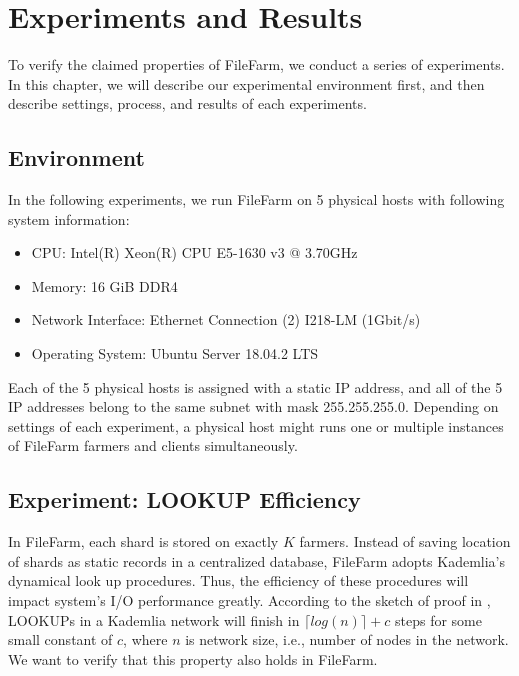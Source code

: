 \chapter{Experiments and Results}
\label{c:experiments_and_results}

To verify the claimed properties of FileFarm, we conduct a series of experiments. In this chapter, we will describe our experimental environment first, and then describe settings, process, and results of each experiments.

\section{Environment}
\label{s:expenvironment}

In the following experiments, we run FileFarm on 5 physical hosts with following system information:

\begin{itemize}
    \item CPU: Intel(R) Xeon(R) CPU E5-1630 v3 @ 3.70GHz
    \item Memory: 16 GiB DDR4
    \item Network Interface: Ethernet Connection (2) I218-LM (1Gbit/s)
    \item Operating System: Ubuntu Server 18.04.2 LTS
\end{itemize}

 \noindent Each of the 5 physical hosts is assigned with a static IP address, and all of the 5 IP addresses belong to the same subnet with mask 255.255.255.0. Depending on settings of each experiment, a physical host might runs one or multiple instances of FileFarm farmers and clients simultaneously.

\newpage

\section{Experiment: LOOKUP Efficiency}
\label{s:explookupefficiency}

In FileFarm, each shard is stored on exactly $K$ farmers. Instead of saving location of shards as static records in a centralized database, FileFarm adopts Kademlia's dynamical look up procedures. Thus, the efficiency of these procedures will impact system's I/O performance greatly. According to the sketch of proof in \cite{maymounkov2002kademlia}, LOOKUPs in a Kademlia network will finish in $\lceil log(n) \rceil + c$ steps for some small constant of $c$, where $n$ is network size, i.e., number of nodes in the network. We want to verify that this property also holds in FileFarm.


